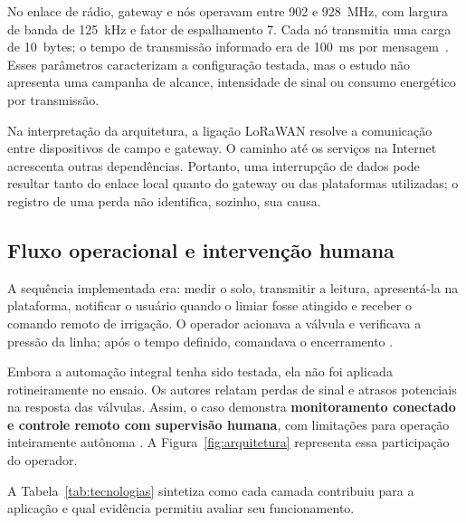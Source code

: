 \documentclass[11pt,a4paper]{article}
\begin{document}
No enlace de rádio, gateway e nós operavam entre 902 e 928~MHz, com largura de banda de 125~kHz e fator de espalhamento 7. Cada nó transmitia uma carga de 10~bytes; o tempo de transmissão informado era de 100~ms por mensagem~\cite{zhang2022}. Esses parâmetros caracterizam a configuração testada, mas o estudo não apresenta uma campanha de alcance, intensidade de sinal ou consumo energético por transmissão.

Na interpretação da arquitetura, a ligação LoRaWAN resolve a comunicação entre dispositivos de campo e gateway. O caminho até os serviços na Internet acrescenta outras dependências. Portanto, uma interrupção de dados pode resultar tanto do enlace local quanto do gateway ou das plataformas utilizadas; o registro de uma perda não identifica, sozinho, sua causa.

\subsection{Fluxo operacional e intervenção humana}
A sequência implementada era: medir o solo, transmitir a leitura, apresentá-la na plataforma, notificar o usuário quando o limiar fosse atingido e receber o comando remoto de irrigação. O operador acionava a válvula e verificava a pressão da linha; após o tempo definido, comandava o encerramento \cite{zhang2022}.

Embora a automação integral tenha sido testada, ela não foi aplicada rotineiramente no ensaio. Os autores relatam perdas de sinal e atrasos potenciais na resposta das válvulas. Assim, o caso demonstra \textbf{monitoramento conectado e controle remoto com supervisão humana}, com limitações para operação inteiramente autônoma \cite{zhang2022}. A Figura~\ref{fig:arquitetura} representa essa participação do operador.

A Tabela~\ref{tab:tecnologias} sintetiza como cada camada contribuiu para a aplicação e qual evidência permitiu avaliar seu funcionamento.
\end{document}
